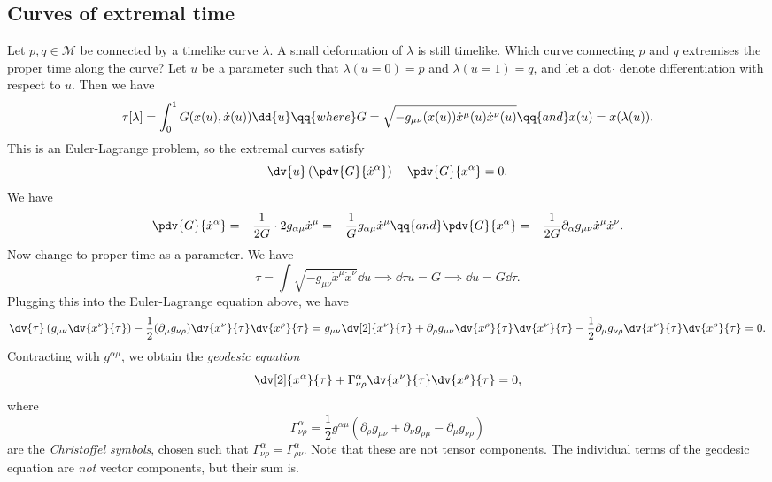 \documentclass{jknotes}
\begin{document}
\subsection{Curves of extremal time}
Let \(p,q\in\mathcal{M}\) be connected by a timelike curve \(\lambda\). A small deformation of \(\lambda\) is still timelike. Which curve connecting \(p\) and \(q\) extremises the proper time along the curve? Let \(u\) be a parameter such that \(\lambda(u=0) = p\) and \(\lambda(u=1) = q\), and let a dot \(\dot{}\) denote differentiation with respect to \(u\). Then we have
\begin{equation}
    \tau[\lambda] = \int^1_0 G(x(u),\dot{x}(u)) \dd{u} \qq{where} G = \sqrt{-g_{\mu\nu}(x(u)) \dot{x}^\mu(u)\dot{x}^\nu(u)} \qq{and} x(u) = x(\lambda(u)).
\end{equation}
This is an Euler-Lagrange problem, so the extremal curves satisfy
\begin{equation}
    \dv{u}\left(\pdv{G}{\dot{x}^\alpha}\right) - \pdv{G}{x^\alpha} = 0.
\end{equation}
We have
\begin{equation}
    \pdv{G}{\dot{x}^\alpha}= -\frac1{2G}\cdot2g_{\alpha\mu}\dot{x}^\mu = -\frac1Gg_{\alpha\mu}\dot{x}^\mu
    \qq{and}
    \pdv{G}{x^\alpha} = -\frac1{2G}\partial_\alpha g_{\mu\nu}\dot{x}^\mu\dot{x}^\nu.
\end{equation}
Now change to proper time as a parameter. We have
\begin{equation}
    \tau = \int \sqrt{-g_{\mu\nu}\dot{x}^\mu\dot{x}^\nu} \dd{u} \implies \dd{\tau}{u} = G \implies \dd{u} = G\dd{\tau}.
\end{equation}
Plugging this into the Euler-Lagrange equation above, we have
\begin{equation}
    \dv{\tau}\left(g_{\mu\nu}\dv{x^\nu}{\tau}\right) - \frac12(\partial_\mu g_{\nu\rho})\dv{x^\nu}{\tau}\dv{x^\rho}{\tau}
    = g_{\mu\nu}\dv[2]{x^\nu}{\tau} + \partial_\rho g_{\mu\nu} \dv{x^\rho}{\tau}\dv{x^\nu}{\tau} -\frac12\partial_\mu g_{\nu\rho}\dv{x^\nu}{\tau}\dv{x^\rho}{\tau} = 0.
\end{equation}
Contracting with \(g^{\alpha\mu}\), we obtain the \emph{geodesic equation}
\begin{equation}
    \dv[2]{x^\alpha}{\tau} + \Gamma^\alpha_{\nu\rho}\dv{x^\nu}{\tau}\dv{x^\rho}{\tau} = 0,
\end{equation}
where
\begin{equation}
    \Gamma^\alpha_{\nu\rho} = \frac12g^{\alpha\mu}\left(\partial_\rho g_{\mu\nu} + \partial_\nu g_{\rho\mu} - \partial_\mu g_{\nu\rho}\right)
\end{equation}
are the \emph{Christoffel symbols}, chosen such that \(\Gamma^\alpha_{\nu\rho} = \Gamma^\alpha_{\rho\nu}\). Note that these are not tensor components. The individual terms of the geodesic equation are \emph{not} vector components, but their sum is.
\end{document}
